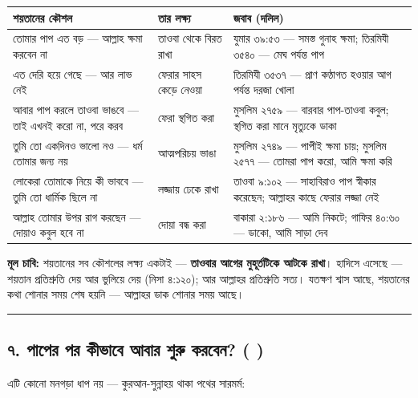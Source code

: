 \begin{table}[h]\centering\small
\begin{tabular}{lll}
শয়তানের কৌশল & তার লক্ষ্য & জবাব (দলিল) \\
\hline
\lat{“}তোমার পাপ এত বড় — আল্লাহ ক্ষমা করবেন না\lat{”} & তাওবা থেকে বিরত রাখা & যুমার ৩৯:৫৩ — সমস্ত গুনাহ ক্ষমা; তিরমিযী ৩৫৪০ — মেঘ পর্যন্ত পাপ \\
\lat{“}এত দেরি হয়ে গেছে — আর লাভ নেই\lat{”} & ফেরার সাহস কেড়ে নেওয়া & তিরমিযী ৩৫৩৭ — প্রাণ কণ্ঠাগত হওয়ার আগ পর্যন্ত দরজা খোলা \\
\lat{“}আবার পাপ করলে তাওবা ভাঙবে — তাই এখনই করো না, পরে করব\lat{”} & ফেরা স্থগিত করা & মুসলিম ২৭৫৯ — বারবার পাপ-তাওবা কবুল; স্থগিত করা মানে মৃত্যুকে ডাকা \\
\lat{“}তুমি তো একদিনও ভালো নও — ধর্ম তোমার জন্য নয়\lat{”} & আত্মপরিচয় ভাঙা & মুসলিম ২৭৪৯ — পাপীই ক্ষমা চায়; মুসলিম ২৫৭৭ — \lat{“}তোমরা পাপ করো, আমি ক্ষমা করি\lat{”} \\
\lat{“}লোকেরা তোমাকে নিয়ে কী ভাববে — তুমি তো ধার্মিক ছিলে না\lat{”} & লজ্জায় ঢেকে রাখা & তাওবা ৯:১০২ — সাহাবিরাও পাপ স্বীকার করেছেন; আল্লাহর কাছে ফেরার লজ্জা নেই \\
\lat{“}আল্লাহ তোমার উপর রাগ করছেন — দোয়াও কবুল হবে না\lat{”} & দোয়া বন্ধ করা & বাকারা ২:১৮৬ — \lat{“}আমি নিকটে\lat{”}; গাফির ৪০:৬০ — \lat{“}ডাকো, আমি সাড়া দেব\lat{”} \\
\hline
\end{tabular}
\end{table}

\textbf{মূল চাবি:} শয়তানের সব কৌশলের লক্ষ্য একটাই — \textbf{তাওবার আগের মুহূর্তটিকে আটকে রাখা}। হাদিসে এসেছে — শয়তান প্রতিশ্রুতি দেয় আর ভুলিয়ে দেয় (নিসা ৪:১২০); আর আল্লাহর প্রতিশ্রুতি সত্য। যতক্ষণ শ্বাস আছে, শয়তানের কথা শোনার সময় শেষ হয়নি — আল্লাহর ডাক শোনার সময় আছে।

\medskip\hrule\medskip

\subsection*{৭. পাপের পর কীভাবে আবার শুরু করবেন? (    )}

এটি কোনো মনগড়া ধাপ নয় — কুরআন-সুন্নাহয় থাকা পথের সারমর্ম:

